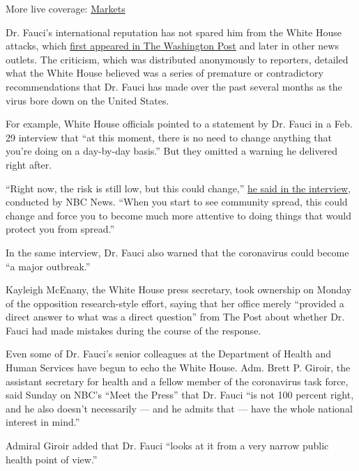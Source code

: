 More live coverage:
\href{https://www.nytimes.com/live/2020/08/03/business/stock-market-today-coronavirus?action=click\&pgtype=Article\&state=default\&region=MAIN_CONTENT_1\&context=storylines_live_updates}{Markets}

Dr. Fauci's international reputation has not spared him from the White
House attacks, which
\href{https://www.washingtonpost.com/politics/2020/07/11/fauci-trump-coronavirus/}{first
appeared in The Washington Post} and later in other news outlets. The
criticism, which was distributed anonymously to reporters, detailed what
the White House believed was a series of premature or contradictory
recommendations that Dr. Fauci has made over the past several months as
the virus bore down on the United States.

For example, White House officials pointed to a statement by Dr. Fauci
in a Feb. 29 interview that ``at this moment, there is no need to change
anything that you're doing on a day-by-day basis.'' But they omitted a
warning he delivered right after.

``Right now, the risk is still low, but this could change,''
\href{https://www.politifact.com/factchecks/2020/apr/13/deanna-lorraine/tweet-amplified-trump-misleads-faucis-late-februar/}{he
said in the interview}, conducted by NBC News. ``When you start to see
community spread, this could change and force you to become much more
attentive to doing things that would protect you from spread.''

In the same interview, Dr. Fauci also warned that the coronavirus could
become ``a major outbreak.''

Kayleigh McEnany, the White House press secretary, took ownership on
Monday of the opposition research-style effort, saying that her office
merely ``provided a direct answer to what was a direct question'' from
The Post about whether Dr. Fauci had made mistakes during the course of
the response.

Even some of Dr. Fauci's senior colleagues at the Department of Health
and Human Services have begun to echo the White House. Adm. Brett P.
Giroir, the assistant secretary for health and a fellow member of the
coronavirus task force, said Sunday on NBC's ``Meet the Press'' that Dr.
Fauci ``is not 100 percent right, and he also doesn't necessarily ---
and he admits that --- have the whole national interest in mind.''

Admiral Giroir added that Dr. Fauci ``looks at it from a very narrow
public health point of view.''

